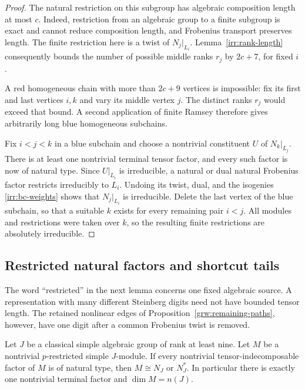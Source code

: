 \begin{proof}
The natural restriction on this subgroup has algebraic composition length
at most $c$.  Indeed, restriction from an algebraic group to a finite
subgroup is exact and cannot reduce composition length, and Frobenius
transport preserves length.  The finite restriction here is a twist of
$N_j|_{L_i}$.
Lemma~\ref{irr:rank-length} consequently bounds the number of possible
middle ranks $r_j$ by $2c+7$, for fixed $i$.

A red homogeneous chain with more than $2c+9$ vertices is impossible:
fix its first and last vertices $i,k$ and vary its middle vertex $j$.
The distinct ranks $r_j$ would exceed that bound.
A second application of finite Ramsey therefore gives arbitrarily long
blue homogeneous subchains.

Fix $i<j<k$ in a blue subchain and choose a nontrivial constituent $U$
of $N_k|_{L_j}$.  There is at least one nontrivial terminal tensor factor,
and every such factor is now of natural type.
Since $U|_{L_i}$ is irreducible, a natural or dual natural Frobenius factor
restricts irreducibly to $L_i$.
Undoing its twist, dual, and the isogenies
\eqref{irr:bc-weights} shows that $N_j|_{L_i}$ is irreducible.
Delete the last vertex of the blue subchain, so that a suitable $k$ exists
for every remaining pair $i<j$.
All modules and restrictions were taken over $k$, so the resulting finite
restrictions are absolutely irreducible.
\end{proof}

\subsection{Restricted natural factors and shortcut tails}

The word ``restricted'' in the next lemma concerns one fixed algebraic
source.  A representation with many different Steinberg digits need not
have bounded tensor length.  The retained nonlinear edges of
Proposition~\ref{grw:remaining-paths}, however, have one digit after a
common Frobenius twist is removed.

\begin{lemma}
\label{irr:restricted-natural}
Let $J$ be a classical simple algebraic group of rank at least nine.
Let $M$ be a nontrivial $p$-restricted simple $J$-module.
If every nontrivial tensor-indecomposable factor of $M$ is of natural type,
then $M\cong N_J$ or $N_J^*$.
In particular there is exactly one nontrivial terminal factor and
$\dim M=n(J)$.
\end{lemma}

